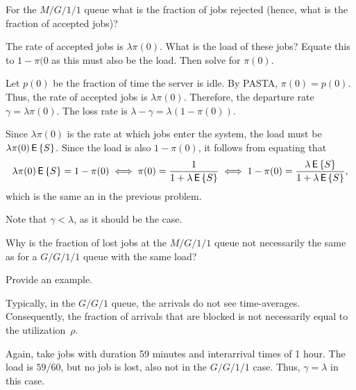 \begin{exercise}
  For the $M/G/1/1$ queue what is the fraction of jobs rejected
  (hence, what is the fraction of accepted jobs)?  
  \begin{hint}
The rate of
    accepted jobs is $\lambda \pi(0)$. What is the load of these jobs?
    Equate this to $1-\pi(0$ as this must also be the load. Then solve for $\pi(0)$.
  \end{hint}
  \begin{solution}
    Let $p(0)$ be the fraction of time the server is idle. By PASTA,
    $\pi(0)=p(0)$. Thus, the rate of accepted jobs is
    $\lambda\pi(0)$. Therefore, the departure rate
    $\gamma=\lambda\pi(0)$. The loss rate is
    $\lambda-\gamma = \lambda (1-\pi(0))$.

    Since $\lambda\pi(0)$ is the rate at which jobs enter the system,
    the load must be $\lambda\pi(0)\,\mathsf{E}\left\{S\right\}$. Since the load is also
    $1-\pi(0)$, it follows from equating that
    \begin{equation*}
      \lambda\pi(0) \,\mathsf{E}\left\{S\right\} = 1 - \pi(0) \iff \pi(0)=\frac1{1+\lambda\,\mathsf{E}\left\{S\right\}} 
\iff 1-\pi(0) = \frac{\lambda \,\mathsf{E}\left\{S\right\}}{1+\lambda \,\mathsf{E}\left\{S\right\}},
    \end{equation*}
which is the same an in the previous problem.

Note that  $\gamma < \lambda$, as it should be the case. 
  \end{solution}
\end{exercise}


\begin{exercise}
  Why is the fraction of lost jobs at the $M/G/1/1$ queue not
  necessarily the same as for a $G/G/1/1$ queue with the same load?  
  \begin{hint}
Provide an  example.
  \end{hint}
  \begin{solution}
 Typically, in the $G/G/1$ queue, the arrivals do not see  time-averages. Consequently, the fraction of arrivals that are blocked is not necessarily equal to the utilization~$\rho$.

  Again, take jobs with duration 59 minutes and interarrival times of
  1 hour. The load is $59/60$, but no job is lost, also not in the
  $G/G/1/1$ case. Thus, $\gamma=\lambda$ in this case.
  \end{solution}
\end{exercise}


\begin{comment}
  
\begin{exercise}[use=false]
  Use the ideas of Section~\ref{sec:arrival-processes} to derive an
  expression for the density $f_r$ of the remaining service times as
  seen by the Poisson arrivals.  In the expression, check that it is a
  true density, in the sense that $\int_0^\infty f_r(x) \d x =1$.
  \begin{solution}
    \TBD.
  \end{solution}
\end{exercise}
\end{comment}







